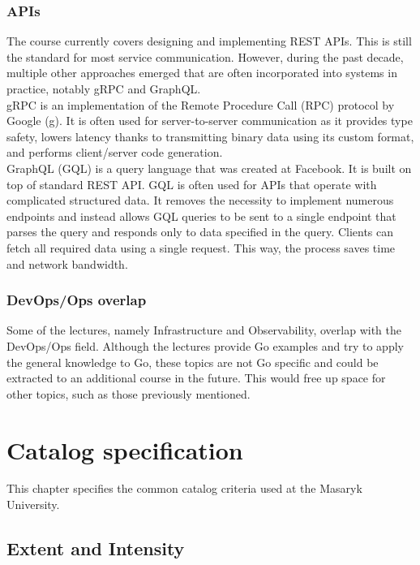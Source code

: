 \documentclass[
  digital,
  color,
  oneside,
  nosansbold,
  nocolorbold,
  lof,
  lot,
]{fithesis4}
\begin{document}
\subsubsection{APIs}

The course currently covers designing and implementing REST APIs. This is still the standard for most service communication. However, during the past decade, multiple other approaches emerged that are often incorporated into systems in practice, notably gRPC and GraphQL. \\

gRPC is an implementation of the Remote Procedure Call (RPC) protocol by Google (g). It is often used for server-to-server communication as it provides type safety, lowers latency thanks to transmitting binary data using its custom format, and performs client/server code generation. \\

GraphQL (GQL) is a query language that was created at Facebook. It is built on top of standard REST API. GQL is often used for APIs that operate with complicated structured data. It removes the necessity to implement numerous endpoints and instead allows GQL queries to be sent to a single endpoint that parses the query and responds only to data specified in the query. Clients can fetch all required data using a single request. This way, the process saves time and network bandwidth.

\subsubsection{DevOps/Ops overlap}

Some of the lectures, namely Infrastructure and Observability, overlap with the DevOps/Ops field. Although the lectures provide Go examples and try to apply the general knowledge to Go, these topics are not Go specific and could be extracted to an additional course in the future. This would free up space for other topics, such as those previously mentioned.

\section{Catalog specification}

This chapter specifies the common catalog criteria used at the Masaryk University.

\subsection{Extent and Intensity}
\end{document}
